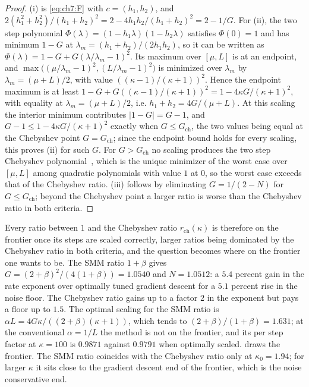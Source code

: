 \begin{proof}
(i) is \eqref{eq:ch7:F} with $c=(h_1,h_2)$, and $2(h_1^2+h_2^2)/(h_1+h_2)^2
=2-4h_1h_2/(h_1+h_2)^2=2-1/G$. For (ii), the two step polynomial
$\Phi(\lambda)=(1-h_1\lambda)(1-h_2\lambda)$ satisfies $\Phi(0)=1$ and has minimum
$1-G$ at $\lambda_m=(h_1+h_2)/(2h_1h_2)$, so it can be written as
$\Phi(\lambda)=1-G+G(\lambda/\lambda_m-1)^2$. Its maximum over $[\mu,L]$ is at an
endpoint, and $\max\bigl((\mu/\lambda_m-1)^2,(L/\lambda_m-1)^2\bigr)$ is
minimized over $\lambda_m$ by $\lambda_m=(\mu+L)/2$, with value
$((\kappa-1)/(\kappa+1))^2$. Hence the endpoint maximum is at least
$1-G+G((\kappa-1)/(\kappa+1))^2=1-4\kappa G/(\kappa+1)^2$, with equality at
$\lambda_m=(\mu+L)/2$, i.e. $h_1+h_2=4G/(\mu+L)$.
At this scaling the interior minimum contributes $|1-G|=G-1$, and $G-1\le1-4\kappa G/(\kappa+1)^2$ exactly when $G\le G_{\mathrm{ch}}$, the two values being equal at the Chebyshev point $G=G_{\mathrm{ch}}$; since the endpoint bound holds for every scaling, this proves (ii) for such $G$.
For $G>G_{\mathrm{ch}}$ no scaling produces the two step Chebyshev polynomial~\cite{young1953,golub1961}, which is the unique minimizer of the worst case over $[\mu,L]$ among quadratic polynomials with value $1$ at $0$, so the worst case exceeds that of the Chebyshev ratio.
(iii) follows by eliminating $G=1/(2-N)$ for $G\le G_{\mathrm{ch}}$; beyond the Chebyshev point a larger ratio is worse than the Chebyshev ratio in both criteria.
\end{proof}

Every ratio between $1$ and the Chebyshev ratio $r_{\mathrm{ch}}(\kappa)$ is therefore on the frontier once its steps are scaled correctly, larger ratios being dominated by the Chebyshev ratio in both criteria, and the question becomes where on the frontier one wants to be.
The SMM ratio
$1+\beta$ gives $G=(2+\beta)^2/(4(1+\beta))=1.0540$ and $N=1.0512$: a $5.4$
percent gain in the rate exponent over optimally tuned gradient descent for a
$5.1$ percent rise in the noise floor. The Chebyshev ratio gains up to a factor
$2$ in the exponent but pays a floor up to $1.5$. The optimal scaling for the
SMM ratio is $\alpha L=4G\kappa/((2+\beta)(\kappa+1))$, which tends to
$(2+\beta)/(1+\beta)=1.631$; at the conventional $\alpha=1/L$ the method is not
on the frontier, and its per step factor at $\kappa=100$ is $0.9871$ against
$0.9791$ when optimally scaled.  draws the frontier. The
SMM ratio coincides with the Chebyshev ratio only at $\kappa_0=1.94$; for
larger $\kappa$ it sits close to the gradient descent end of the frontier,
which is the noise conservative end.

